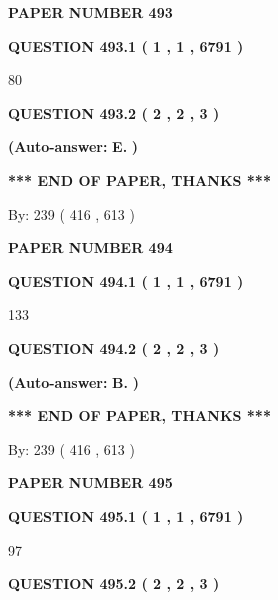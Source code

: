 \documentclass[12pt]{article}
\begin{document}
   
\newpage 
\setcounter{page}{ 
   493001 } 
   
   
 {\textbf{ \Large{ PAPER NUMBER  493  }}}
   
   
   
   
  
  
{\textbf{\large{QUESTION
493.1 
 ( 1 , 1 , 6791 )
}}}

80
  
  
{\textbf{\large{QUESTION
493.2 
 ( 2 , 2 , 3 )
}}}
 
 
{\textbf{(Auto-answer:}}
{\textbf{\large{
E.}}}
{\textbf{)}}
 
 
   
   
   
   
\vspace{1.0in} 
{\textbf{\large{ *** END OF PAPER, THANKS *** }}} 
   
   
\hspace{1.0in} By: 
 239 ( 416 ,  613 )
   
   
   
   
\newpage 
\setcounter{page}{ 
   494001 } 
   
   
 {\textbf{ \Large{ PAPER NUMBER  494  }}}
   
   
   
   
  
  
{\textbf{\large{QUESTION
494.1 
 ( 1 , 1 , 6791 )
}}}

133
  
  
{\textbf{\large{QUESTION
494.2 
 ( 2 , 2 , 3 )
}}}
 
 
{\textbf{(Auto-answer:}}
{\textbf{\large{
B.}}}
{\textbf{)}}
 
 
   
   
   
   
\vspace{1.0in} 
{\textbf{\large{ *** END OF PAPER, THANKS *** }}} 
   
   
\hspace{1.0in} By: 
 239 ( 416 ,  613 )
   
   
   
   
\newpage 
\setcounter{page}{ 
   495001 } 
   
   
 {\textbf{ \Large{ PAPER NUMBER  495  }}}
   
   
   
   
  
  
{\textbf{\large{QUESTION
495.1 
 ( 1 , 1 , 6791 )
}}}

97
  
  
{\textbf{\large{QUESTION
495.2 
 ( 2 , 2 , 3 )
}}}
 
\end{document}
